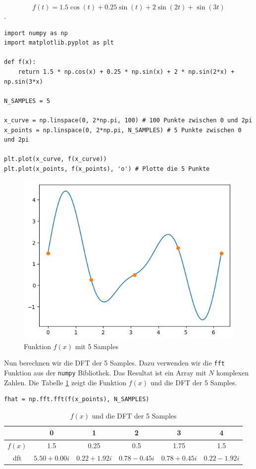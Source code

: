\documentclass[11pt,a4paper]{article}
\begin{document}
\[ f(t) = 1.5 \cos(t) + 0.25 \sin(t) + 2 \sin(2t) + \sin(3t) \].


\begin{lstlisting}
import numpy as np
import matplotlib.pyplot as plt

def f(x):
    return 1.5 * np.cos(x) + 0.25 * np.sin(x) + 2 * np.sin(2*x) + np.sin(3*x)

N_SAMPLES = 5

x_curve = np.linspace(0, 2*np.pi, 100) # 100 Punkte zwischen 0 und 2pi
x_points = np.linspace(0, 2*np.pi, N_SAMPLES) # 5 Punkte zwischen 0 und 2pi

plt.plot(x_curve, f(x_curve))
plt.plot(x_points, f(x_points), 'o') # Plotte die 5 Punkte
\end{lstlisting}

\begin{figure}[h]
	\centering
	\includegraphics[width=0.60\linewidth]{img/dft.png}
	\caption{Funktion \( f(x) \) mit 5 Samples}
	\label{fig:dft_example}
\end{figure}

\noindent
Nun berechnen wir die DFT der 5 Samples. Dazu verwenden wir die \texttt{fft} Funktion aus der
\texttt{numpy} Bibliothek. Das Resultat ist ein Array mit \(N\) komplexen Zahlen. Die Tabelle
\ref{tab:dft_example_table} zeigt die Funktion \(f(x)\) und die DFT der 5 Samples.

\begin{lstlisting}
fhat = np.fft.fft(f(x_points), N_SAMPLES)
\end{lstlisting}

\begin{table}[h]
	\centering
	\begin{tabular}{|c|c|c|c|c|c|}
		\hline
		         & 0                & 1                & 2                & 3                & 4                \\
		\hline
		\(f(x)\) & 1.5              & 0.25             & 0.5              & 1.75             & 1.5              \\
		\hline
		dft      & \(5.50 + 0.00i\) & \(0.22 + 1.92i\) & \(0.78 - 0.45i\) & \(0.78 + 0.45i\) & \(0.22 - 1.92i\) \\
		\hline
	\end{tabular}
	\caption{\(f(x)\) und die DFT der 5 Samples}
	\label{tab:dft_example_table}
\end{table}
\end{document}

